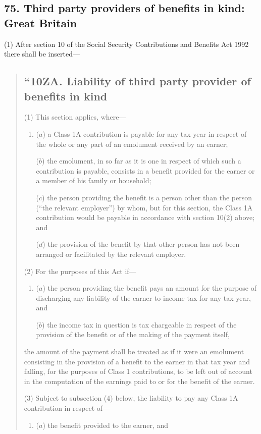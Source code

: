 \documentclass[12pt,a4paper]{article}
\begin{document}
\subsection{75. Third party providers of benefits in kind: Great Britain}

(1) After section 10 of the Social Security Contributions and Benefits Act 1992 there shall be inserted—
\begin{quotation}
\subsection*{“10ZA. Liability of third party provider of benefits in kind}

(1) This section applies, where—
\begin{enumerate}\item[]
($a$) a Class 1A contribution is payable for any tax year in respect of the whole or any part of an emolument received by an earner;

($b$) the emolument, in so far as it is one in respect of which such a contribution is payable, consists in a benefit provided for the earner or a member of his family or household;

($c$) the person providing the benefit is a person other than the person (“the relevant employer”) by whom, but for this section, the Class 1A contribution would be payable in accordance with section 10(2)  above; and

($d$) the provision of the benefit by that other person has not been arranged or facilitated by the relevant employer.
\end{enumerate}

(2) For the purposes of this Act if—
\begin{enumerate}\item[]
($a$) the person providing the benefit pays an amount for the purpose of discharging any liability of the earner to income tax for any tax year, and

($b$) the income tax in question is tax chargeable in respect of the provision of the benefit or of the making of the payment itself,
\end{enumerate}
the amount of the payment shall be treated as if it were an emolument consisting in the provision of a benefit to the earner in that tax year and falling, for the purposes of Class 1 contributions, to be left out of account in the computation of the earnings paid to or for the benefit of the earner.

(3) Subject to subsection (4)  below, the liability to pay any Class 1A contribution in respect of—
\begin{enumerate}\item[]
($a$) the benefit provided to the earner, and


\end{enumerate}
\end{quotation}
\end{document}
